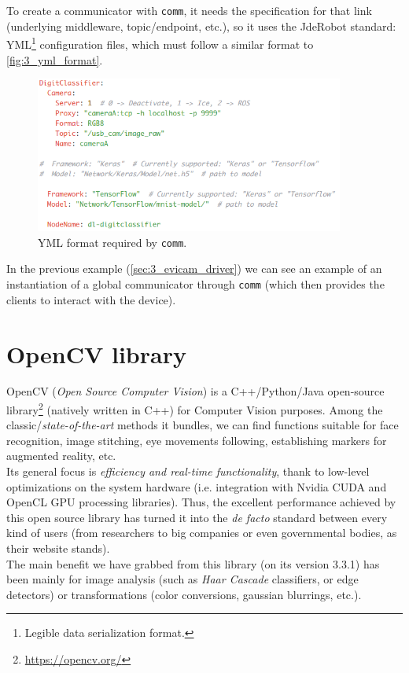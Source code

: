 		To create a communicator with \texttt{comm}, it needs the specification for that link (underlying middleware, topic/endpoint, etc.), so it uses the JdeRobot standard: YML\footnote{Legible data serialization format.} configuration files, which must follow a similar format to  \autoref{fig:3_yml_format}.
		\begin{figure}[h]
			\centering
			\includegraphics[width=4in]{images/yml_format}
			\caption{YML format required by \texttt{comm}.}
			\label{fig:3_yml_format}
		\end{figure}
		
		In the previous example (\ref{sec:3_evicam_driver}) we can see an example of an instantiation of a global communicator through \texttt{comm} (which then provides the clients to interact with the device).
		
\section{OpenCV library}
	OpenCV (\emph{Open Source Computer Vision}) is a C++/Python/Java open-source library\footnote{\url{https://opencv.org/}} (natively written in C++) for Computer Vision purposes. Among the classic/\emph{state-of-the-art} methods it bundles, we can find functions suitable for face recognition, image stitching, eye movements following, establishing markers for augmented reality, etc.\\
	
	Its general focus is \emph{efficiency and real-time functionality}, thank to low-level optimizations on the system hardware (i.e. integration with Nvidia CUDA and OpenCL GPU processing libraries). Thus, the excellent performance achieved by this open source library has turned it into the \emph{de facto} standard between every kind of users (from researchers to big companies or even governmental bodies, as their website stands).\\
	
	The main benefit we have grabbed from this library (on its version 3.3.1) has been mainly for image analysis (such as \emph{Haar Cascade} classifiers, or edge detectors) or transformations (color conversions, gaussian blurrings, etc.).\\

